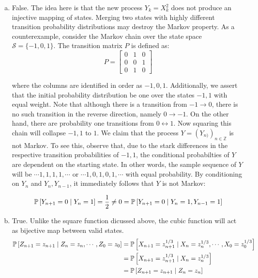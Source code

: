 \documentclass[12pt]{article}%
\begin{document}
\begin{enumerate}[a.]
  \item False. The idea here is that the new process $Y_k = X_{k}^2$ does not produce an injective mapping of states. Merging two states with highly different transition probability distributions may destroy the Markov property. As a counterexample, consider the Markov chain over the state space $\mathcal{S} = \{-1,0,1\}$. The transition matrix $P$ is defined as:
        \[P = \begin{bmatrix} 0 & 1 & 0 \\
                0 & 0 & 1 \\
                0 & 1 & 0 \end{bmatrix}\]

        where the columns are identified in order as $-1,0,1$. Additionally, we assert that the initial probability distribution be one over the states $-1,1$ with equal weight. Note that although there is a transition from $-1 \rightarrow 0$, there is no such transition in the reverse direction, namely $0 \rightarrow -1$. On the other hand, there are probability one transitions from $0 \leftrightarrow 1$. Now squaring this chain will collapse $-1,1$ to $1$. We claim that the process $Y = (Y_{n)})_{n \in \mathbb{Z}}$ is not Markov. To see this, observe that, due to the stark differences in the respective transition probabilities of $-1,1$, the conditional probabilties of $Y$ are dependent on the starting state. In other words, the sample sequence of $Y$ will be $\cdots 1, 1, 1, 1, \cdots$ or $\cdots 1,0,1,0,1, \cdots$ with equal probability. By conditioning on $Y_{n}$ and $Y_{n},Y_{{n-1}}$, it immediately follows that $Y$ is not Markov:

        \[\mathbb{P}\left[Y_{n+1} = 0 \mid Y_n = 1\right] = \frac{1}{2} \neq 0 = \mathbb{P}\left[Y_{n+1} = 0 \mid Y_n = 1, Y_{n-1} = 1\right] \]

  \item True. Unlike the square function dicussed above, the cubic function will act as bijective map between valid states.
    \begin{equation}
          \label{eq:2}
\begin{split}
   \mathbb{P}\left[Z_{n+1} = z_{n+1} \mid Z_{n} = z_n , \cdots, Z_0 = z_0\right] & = \mathbb{P}\left[X_{n+1} = z_{n+1}^{{1/3}} \mid X_{n} = z_{{n}}^{1/3}, \cdots, X_{0} = z_{0}^{1/3}\right] \\
  & =  \mathbb{P}\left[X_{n+1} = z_{n+1}^{{1/3}} \mid X_{n} = z_{{n}}^{1/3}\right] \\
  & = \mathbb{P}\left[Z_{n+1} = z_{{n+1}} \mid Z_n=z_{n}\right]
\end{split}
        \end{equation}


\end{enumerate}
\end{document}
